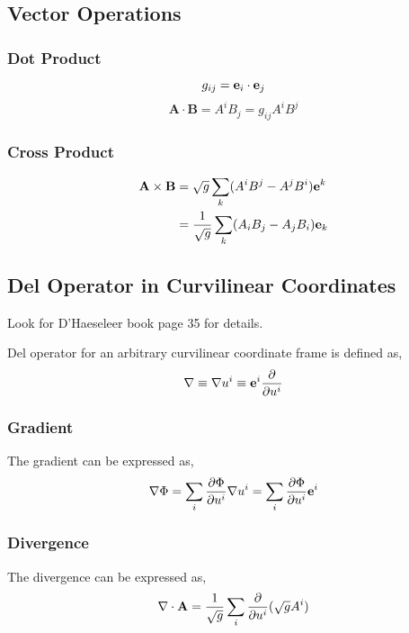 \subsection{Vector Operations}

\subsubsection{Dot Product}
\begin{equation}
    g_{ij} = \mathbf{e}_i \cdot \mathbf{e}_j
\end{equation}
\begin{equation}
    \mathbf{A} \cdot \mathbf{B} = A^i B_j = g_{ij} A^i B^j \label{cl-dot}
\end{equation}

\subsubsection{Cross Product}
\begin{align}
    \mathbf{A} \times \mathbf{B} &= \sqrt{g} \sum_k (A^i B^j - A^j B^i)\mathbf{e}^k \label{cl-cross-contra}\\
    &= \frac{1}{\sqrt{g}} \sum_k (A_i B_j - A_j B_i)\mathbf{e}_k  \label{cl-cross-co}
\end{align}




\subsection{Del Operator in Curvilinear Coordinates}
Look for D'Haeseleer book \cite{dhaeseleer_flux_2012} page 35 for details.

Del operator for an arbitrary curvilinear coordinate frame is defined as,
\begin{equation}
    \nabla \equiv \nabla u^i \equiv \mathbf{e}^i \frac{\partial}{\partial u^i}
\end{equation}
\subsubsection{Gradient}
The gradient can be expressed as,
\begin{equation}
    \nabla \Phi = \sum_i \frac{\partial \Phi}{\partial u^i} \nabla u^i= \sum_i \frac{\partial \Phi}{\partial u^i} \mathbf{e}^i  \label{cl-grad}
\end{equation}

\subsubsection{Divergence}
The divergence can be expressed as,
\begin{equation}
    \nabla \cdot \mathbf{A} = \frac{1}{\sqrt{g}} \sum_i \frac{\partial}{\partial u^i}(\sqrt{g} A^i)  \label{cl-div}
\end{equation}
